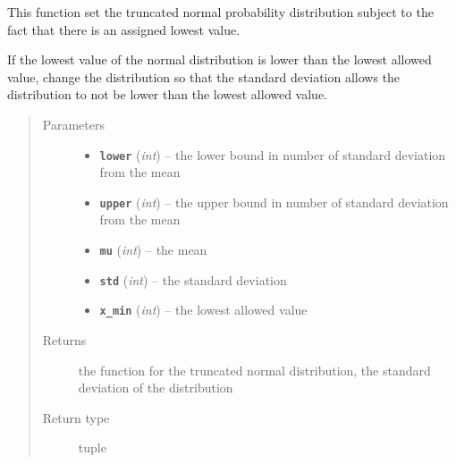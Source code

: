 \documentclass[letterpaper,10pt,english]{sphinxmanual}
\begin{document}

\begin{fulllineitems}
\label{my_globals:my_globals.set_distribution_dt}
This function set the truncated normal probability distribution subject to the fact that there     is an assigned lowest value.

If the lowest value of the normal distribution is lower than the lowest     allowed value, change the distribution so that the standard deviation allows the distribution to not be     lower than the lowest allowed value.
\begin{quote}\begin{description}
\item[{Parameters}] \leavevmode\begin{itemize}
\item {} 
\textbf{\texttt{lower}} (\emph{int}) -- the lower bound in number of standard deviation from the mean

\item {} 
\textbf{\texttt{upper}} (\emph{int}) -- the upper bound in number of standard deviation from the mean

\item {} 
\textbf{\texttt{mu}} (\emph{int}) -- the mean

\item {} 
\textbf{\texttt{std}} (\emph{int}) -- the standard deviation

\item {} 
\textbf{\texttt{x\_min}} (\emph{int}) -- the lowest allowed value

\end{itemize}

\item[{Returns}] \leavevmode
the function for the truncated normal distribution, the standard deviation of the distribution

\item[{Return type}] \leavevmode
tuple

\end{description}\end{quote}

\end{fulllineitems}

\end{document}
